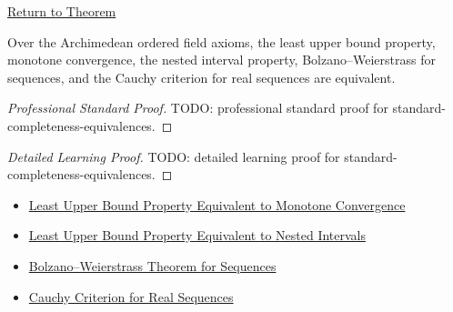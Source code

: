 \newpage
{}
\label{prf:standard-completeness-equivalences}

\begin{remark*}[Return]
\hyperref[thm:standard-completeness-equivalences]{Return to Theorem}
\end{remark*}

\begin{theorem*}
Over the Archimedean ordered field axioms, the least upper bound property,
monotone convergence, the nested interval property, Bolzano--Weierstrass for
sequences, and the Cauchy criterion for real sequences are equivalent.
\end{theorem*}

\begin{proof}[Professional Standard Proof]
\LRAProofBodyStart
TODO: professional standard proof for standard-completeness-equivalences.
\end{proof}

\begin{proof}[Detailed Learning Proof]
\LRAProofBodyStart
TODO: detailed learning proof for standard-completeness-equivalences.
\end{proof}

\begin{remark*}
\end{remark*}

\begin{dependencies}
\begin{itemize}
  \item \hyperref[thm:lub-property-equivalent-monotone-convergence]{Least Upper Bound Property Equivalent to Monotone Convergence}
  \item \hyperref[thm:lub-property-equivalent-nested-interval-property]{Least Upper Bound Property Equivalent to Nested Intervals}
  \item \hyperref[thm:bolzano-weierstrass-sequences]{Bolzano--Weierstrass Theorem for Sequences}
  \item \hyperref[thm:cauchy-criterion-real-sequences]{Cauchy Criterion for Real Sequences}
\end{itemize}
\end{dependencies}

\clearpage
